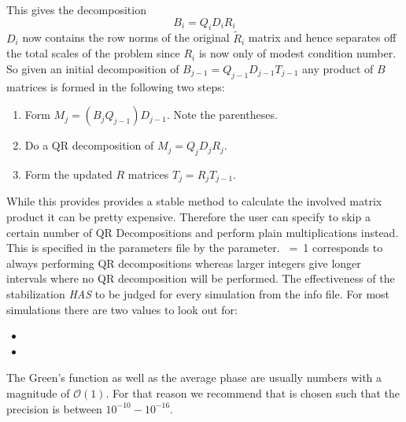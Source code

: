This gives the decomposition
\begin{equation}
B_i = Q_i D_i R_i
\end{equation}
$D_i$ now contains the row norms of the original $\tilde{R}_i$ matrix and hence separates off the total scales of the problem since $R_i$ is now only of modest condition number.
So given an initial decomposition of $B_{j-1} = Q_{j-1} D_{j-1} T_{j-1}$ any product 
of $B$ matrices is formed in the following two steps:
\begin{enumerate}
\item Form $ M_j = (B_j Q_{j-1}) D_{j-1}$. Note the parentheses.
\item Do a QR decomposition of $M_j = Q_j D_j R_j$.
\item Form the updated $R$ matrices $T_j = R_j T_{j-1}$.
\end{enumerate}
While this provides provides a stable method to calculate the involved matrix product
it can be pretty expensive. Therefore the user can specify to skip a certain number of 
QR Decompositions and perform plain multiplications instead. This is specified in the parameters file by the  parameter.
~=~1 corresponds to always performing QR decompositions whereas larger integers give longer intervals where no QR decomposition will be performed.
The effectiveness of the stabilization \emph{HAS} to be judged for every simulation from the info
file. For most simulations there are two values to look out for:
\begin{itemize}
\item {}
\item {}
\end{itemize}
The Green's function as well as the average phase are usually numbers with a magnitude of $\mathcal{O} (1)$. 
For that reason we recommend that  is chosen such that the precision is between $10^{-10} - 10^{-16}$.
